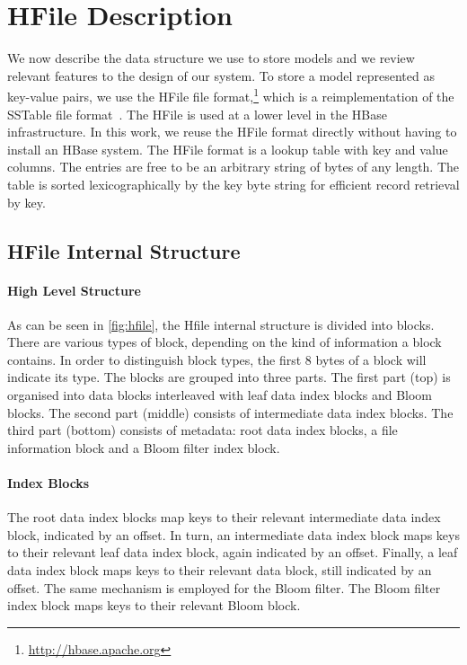 \section{HFile Description}
\label{sec:hfile}

We now describe the data structure we use to store models and we review relevant
features to the design of our system. To store a model represented as key-value
pairs, we use the HFile file format,\footnote{\url{http://hbase.apache.org}} which is
a reimplementation of the SSTable file
format~\citep{chang-dean-ghemawat-hsieh-wallach-burrows-chandra-fikes-gruber:2008:ACM}.
The HFile is used at a lower level in the HBase infrastructure. In this work, we
reuse the HFile format directly without having to install an HBase system. The
HFile format is a lookup table with key and value columns. The entries are free
to be an arbitrary string of bytes of any length. The table is sorted
lexicographically by the key byte string for efficient record retrieval by key.

\subsection{HFile Internal Structure}


\paragraph{High Level Structure} As can be seen in \autoref{fig:hfile},
the Hfile internal structure is divided into blocks. There are various types of
block, depending on the kind of information a block contains.
In order to
distinguish block types, the first 8 bytes of a
block will indicate its type. The blocks are grouped into
three parts. The first part (top) is organised into
data blocks interleaved with leaf data index blocks and Bloom blocks.
The second part (middle) consists of intermediate data index blocks.
The third part (bottom) consists of metadata: root data index blocks, a file
information block and a Bloom filter index block.

\paragraph{Index Blocks} The root data index blocks map keys to their
relevant intermediate data index block, indicated by
an offset. In turn, an intermediate data index block
maps keys to their relevant leaf data index block, again indicated by an offset.
Finally, a leaf data index block maps keys to their relevant data block,
still indicated by an offset. The same mechanism is employed for the Bloom filter.
The Bloom filter index block maps keys to their relevant Bloom block.


